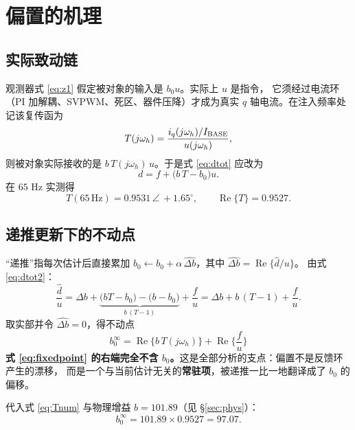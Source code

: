 \documentclass[11pt,a4paper]{ctexart}
\newcommand{\RE}{\operatorname{Re}}
\begin{document}
\section{偏置的机理}

\subsection{实际致动链}

观测器式 \eqref{eq:z1} 假定被对象的输入是 $b_0u$。实际上 $u$ 是指令，
它须经过电流环（PI 加解耦、SVPWM、死区、器件压降）才成为真实 $q$ 轴电流。在注入频率处记该复传函为
\begin{equation}
T(j\omega_h)=\frac{i_q(j\omega_h)/I_{\rm BASE}}{u(j\omega_h)} ,
\label{eq:T}
\end{equation}
则被对象实际接收的是 $b\,T(j\omega_h)\,u$。于是式 \eqref{eq:dtot} 应改为
\begin{equation}
d=f+\big(b\,T-b_0\big)u .
\label{eq:dtot2}
\end{equation}
在 $65$ Hz 实测得
\begin{equation}
T(65\,\mathrm{Hz})=0.9531\,\angle\,+1.65^{\circ},\qquad \RE\{T\}=0.9527 .
\label{eq:Tnum}
\end{equation}

\subsection{递推更新下的不动点}

“递推”指每次估计后直接累加 $b_0\leftarrow b_0+\alpha\,\widehat{\Delta b}$，其中 $\widehat{\Delta b}=\RE\{\hat d/u\}$。
由式 \eqref{eq:dtot2}：
\begin{equation}
\frac{\hat d}{u}=\Delta b+\underbrace{\big(bT-b_0\big)-\big(b-b_0\big)}_{\textstyle b\,(T-1)}+\frac{f}{u}
=\Delta b+b\,(T-1)+\frac{f}{u} .
\label{eq:dbias}
\end{equation}
取实部并令 $\widehat{\Delta b}=0$，得不动点
\begin{equation}
\boxed{\;b_0^{\infty}=\RE\big\{b\,T(j\omega_h)\big\}+\RE\Big\{\frac{f}{u}\Big\}\;}
\label{eq:fixedpoint}
\end{equation}
\textbf{式 \eqref{eq:fixedpoint} 的右端完全不含 $b_0$。}这是全部分析的支点：偏置不是反馈环产生的漂移，
而是一个与当前估计无关的\textbf{常驻项}，被递推一比一地翻译成了 $b_0$ 的偏移。

代入式 \eqref{eq:Tnum} 与物理增益 $b=101.89$（见 \S\ref{sec:phys}）：
\begin{equation}
b_0^{\infty}=101.89\times0.9527=97.07 .
\end{equation}
\end{document}

